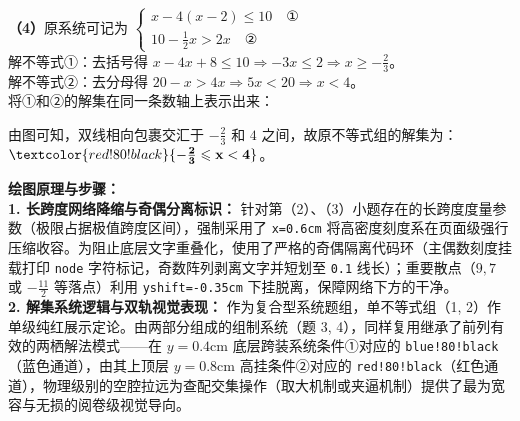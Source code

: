 \vspace{0.4cm}
\textbf{（4）}原系统可记为 $\begin{cases} x-4(x-2) \leqslant 10 \quad \text{①} \\ 10-\frac{1}{2}x > 2x \quad \text{②} \end{cases}$ \\
解不等式①：去括号得 $x-4x+8 \leqslant 10 \Rightarrow -3x \leqslant 2 \Rightarrow x \geqslant -\frac{2}{3}$。\\
解不等式②：去分母得 $20-x > 4x \Rightarrow 5x < 20 \Rightarrow x < 4$。\\
将①和②的解集在同一条数轴上表示出来：
\begin{center}
\end{center}
由图可知，双线相向包裹交汇于 $-\frac{2}{3}$ 和 $4$ 之间，故原不等式组的解集为：$\textcolor{red!80!black}{\mathbf{-\frac{2}{3} \leqslant x < 4}}$。

\vspace{0.4cm}
{\small\color{blue!70!black}
\textbf{绘图原理与步骤：}\\
\textbf{1. 长跨度网络降缩与奇偶分离标识：} 针对第（2）、（3）小题存在的长跨度度量参数（极限占据极值跨度区间），强制采用了 \texttt{x=0.6cm} 将高密度刻度系在页面级强行压缩收容。为阻止底层文字重叠化，使用了严格的奇偶隔离代码环（主偶数刻度挂载打印 \texttt{node} 字符标记，奇数阵列剥离文字并短划至 \texttt{0.1} 线长）；重要散点（$9, 7$ 或 $-\frac{11}{2}$ 等落点）利用 \texttt{yshift=-0.35cm} 下挂脱离，保障网络下方的干净。\\
\textbf{2. 解集系统逻辑与双轨视觉表现：} 作为复合型系统题组，单不等式组（1, 2）作单级纯红展示定论。由两部分组成的组制系统（题 3, 4），同样复用继承了前列有效的两栖解法模式——在 $y=0.4\mathrm{cm}$ 底层跨装系统条件①对应的 \texttt{blue!80!black}（蓝色通道），由其上顶层 $y=0.8\mathrm{cm}$ 高挂条件②对应的 \texttt{red!80!black}（红色通道），物理级别的空腔拉远为查配交集操作（取大机制或夹逼机制）提供了最为宽容与无损的阅卷级视觉导向。
}

